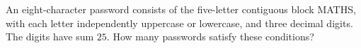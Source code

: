 An eight-character password consists of the five-letter contiguous block MATHS, with each letter independently uppercase or lowercase, and three decimal digits. The digits have sum $25$. How many passwords satisfy these conditions?
